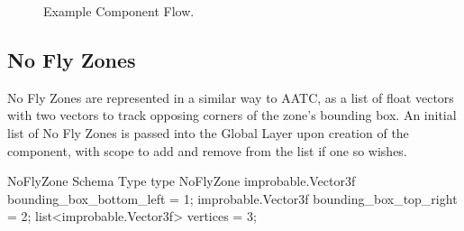 \documentclass[a4paper,11pt,titlepage]{report}
\begin{document}
\begin{figure}[!hbpt]
 \centering
 \caption{Example Component Flow.}
 \label{fig:controller_global_bitmap_flow}
 \end{figure}

\subsection{No Fly Zones}
No Fly Zones are represented in a similar way to AATC, as a list of float vectors with two vectors to track opposing corners of the zone's bounding box. An initial list of No Fly Zones is passed into the Global Layer upon creation of the component, with scope to add and remove from the list if one so wishes.\\
\begin{sexylisting}[colback=white]{NoFlyZone Schema Type}
type NoFlyZone {
  improbable.Vector3f bounding_box_bottom_left = 1;
  improbable.Vector3f bounding_box_top_right = 2;
  list<improbable.Vector3f> vertices = 3;
}
\end{sexylisting}
\end{document}
